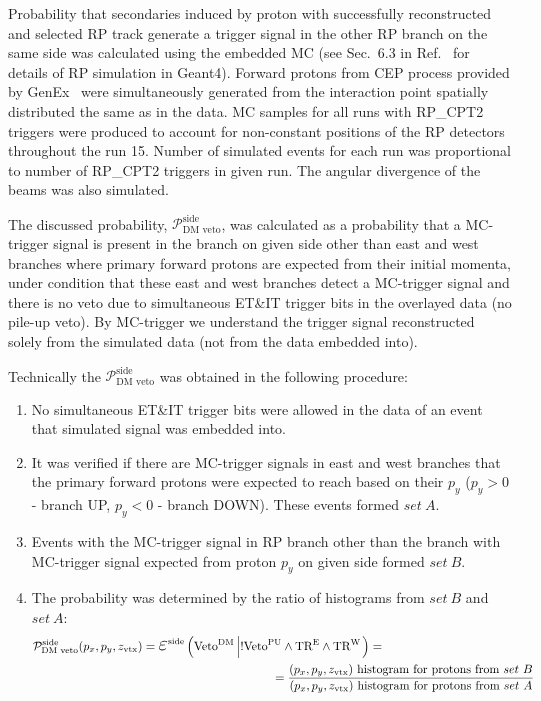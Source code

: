 Probability that secondaries induced by proton with successfully reconstructed and selected RP track generate a trigger signal in the other RP branch on the same side was calculated using the embedded MC (see Sec.~6.3 in Ref.~\cite{supplementaryNote} for details of RP simulation in Geant4). Forward protons from CEP process provided by GenEx~\cite{GenEx} were simultaneously generated from the interaction point spatially distributed the same as in the data. MC samples for all runs with RP\_CPT2 triggers were produced to account for non-constant positions of the RP detectors throughout the run 15. Number of simulated events for each run was proportional to number of RP\_CPT2 triggers in given run. The angular divergence of the beams was also simulated.

The discussed probability, $\mathcal{P}_{\text{DM~veto}}^{\text{side}}$, was calculated as a probability that a MC-trigger signal is present in the branch on given side other than east and west branches where primary forward protons are expected from their initial momenta, under condition that these east and west branches detect a MC-trigger signal and there is no veto due to simultaneous ET\&IT trigger bits in the overlayed data (no pile-up veto). By MC-trigger we understand the trigger signal reconstructed solely from the simulated data (not from the data embedded into).

Technically the $\mathcal{P}_{\text{DM~veto}}^{\text{side}}$ was obtained in the following procedure:
\begin{enumerate}
  \item No simultaneous ET\&IT trigger bits were allowed in the data of an event that simulated signal was embedded into.
	\item It was verified if there are MC-trigger signals in east and west branches that the primary forward protons were expected to reach based on their $p_{y}$ ($p_{y}>0$ - branch UP, $p_{y}<0$ - branch DOWN). These events formed $set~A$.
	\item Events with the MC-trigger signal in RP branch other than the branch with MC-trigger signal expected from proton $p_{y}$ on given side formed $set~B$.
	\item The probability was determined by the ratio of histograms from $set~B$ and $set~A$:
	\begin{equation}\label{eq:rpDeadMatProb}
	\begin{split}
 \mathcal{P}_{\text{DM~veto}}^{\text{side}}(p_{x}, p_{y}, z_{\text{vtx}}) = \mbox{\LARGE$\varepsilon$}^{\text{side}}\left(\Vdm\left|!\Vpu\land\TRE\land\TRW\right.\right) = ~~~~~~~~~~~~~~~~~~~~~~~~~~~~~~~~~~~~~~\\~~~~~~~~~~~~~~~~~~~~~~~~~~~~~~~ =%
 \frac{(p_{x}, p_{y}, z_{\text{vtx}})~\text{histogram for protons from}~set~B}{(p_{x}, p_{y}, z_{\text{vtx}})~\text{histogram for protons from}~set~A}
 \end{split}
  \end{equation}
	
\end{enumerate}

